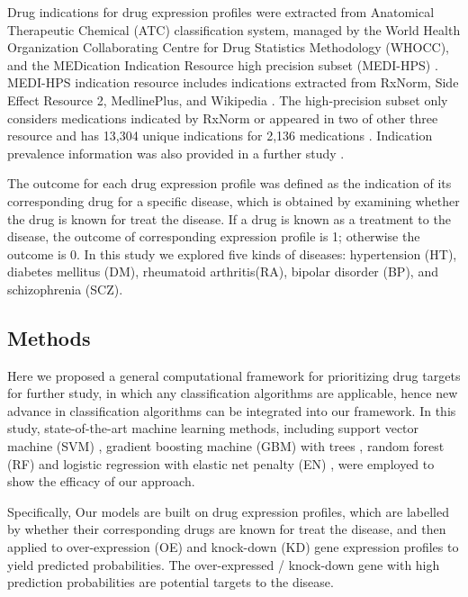     Drug indications for drug expression profiles were extracted from Anatomical Therapeutic Chemical (ATC) classification system, managed by the World Health Organization Collaborating Centre for Drug Statistics Methodology (WHOCC), and the MEDication Indication Resource high precision subset (MEDI-HPS) \cite{wei2013development}. MEDI-HPS indication resource includes indications extracted from RxNorm, Side Effect Resource 2, MedlinePlus, and Wikipedia \cite{wei2013development}. The high-precision subset only considers medications indicated by RxNorm or appeared in two of other three resource and has 13,304 unique indications for 2,136 medications \cite{wei2013development}. Indication prevalence information was also provided in a further study \cite{wei2013validation}. 

    The outcome for each drug expression profile was defined as the indication of its corresponding drug for a specific disease, which is obtained by examining whether the drug is known for treat the disease. If a drug is known as a treatment to the disease, the outcome of corresponding expression profile is 1; otherwise the outcome is 0. In this study we explored five kinds of diseases: hypertension (HT), diabetes mellitus (DM), rheumatoid arthritis(RA), bipolar disorder (BP), and schizophrenia (SCZ).
    
  \subsection{Methods}
    Here we proposed a general computational framework for prioritizing drug targets for further study, in which any classification algorithms are applicable, hence new advance in classification algorithms can be integrated into our framework. In this study, state-of-the-art machine learning methods, including support vector machine (SVM) \cite{cortes1995support}, gradient boosting machine (GBM) with trees \cite{friedman2001greedy}, random forest (RF) \cite{breiman2001random} and logistic regression with elastic net penalty (EN) \cite{zou2005regularization}, were employed to show the efficacy of our approach.

    Specifically, Our models are built on drug expression profiles, which are labelled by whether their corresponding drugs are known for treat the disease, and then applied to over-expression (OE) and knock-down (KD) gene expression profiles to yield predicted probabilities. The over-expressed / knock-down gene with high prediction probabilities are potential targets to the disease. 

